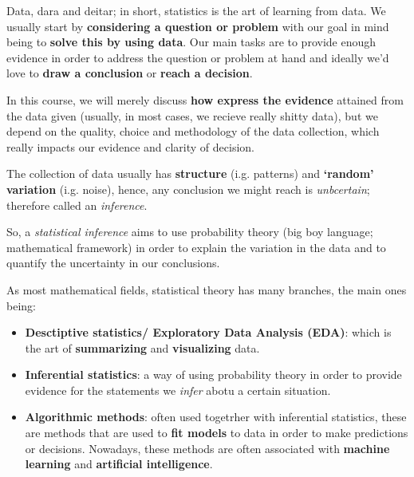 Data, dara and deitar; in short, statistics is the art of learning from data. We usually start by \textbf{considering a question or problem} with our goal in mind being to \textbf{solve this by using
 data}. Our main tasks are to provide enough evidence in order to address the question or problem at hand and ideally we'd love to \textbf{draw a conclusion} or \textbf{reach a decision}.

 \vspace{0.2cm}

 In this course, we will merely discuss \textbf{how express the evidence} attained from the data given (usually, in most cases, we recieve really shitty data), but we depend on the quality, choice and methodology of
 the data collection, which really impacts our evidence and clarity of decision.

 \begin{remark}
    The collection of data usually has \textbf{structure} (i.g. patterns) and \textbf{`random' variation} (i.g. noise), hence, any conclusion we might reach is \textit{unbcertain}; therefore called an \textit{inference}.
 \end{remark}

 \vspace{0.2cm}

 So, a \textit{statistical inference} aims to use probability theory (big boy language; mathematical framework) in order to explain the variation in the data and to quantify the uncertainty in our conclusions.

 \vspace{0.2cm}

 As most mathematical fields, statistical theory has many branches, the main ones being:
 \begin{itemize}
   \item \textbf{Desctiptive statistics/ Exploratory Data Analysis (EDA)}: which is the art of \textbf{summarizing} and \textbf{visualizing} data.
   \item \textbf{Inferential statistics}: a way of using probability theory in order to provide evidence for the statements we \textit{infer} abotu a certain situation.
   \item \textbf{Algorithmic methods}: often used togetrher with inferential statistics, these are methods that are used to \textbf{fit models} to data in order to make predictions or decisions.
   Nowadays, these methods are often associated with \textbf{machine learning} and \textbf{artificial intelligence}. 
 \end{itemize}

